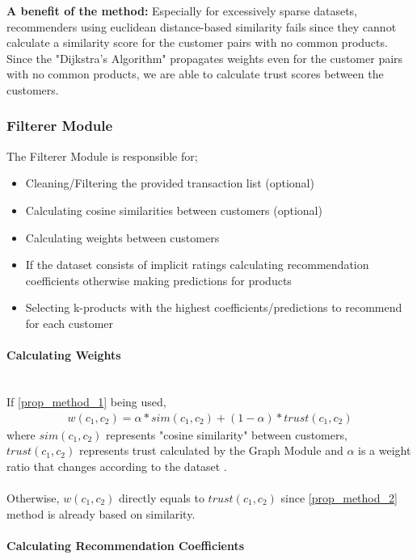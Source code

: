 	\textbf{A benefit of the method:} Especially for excessively sparse datasets, recommenders using euclidean distance-based similarity fails since they cannot calculate a similarity score for the customer pairs with no common products.	Since the  "Dijkstra's Algorithm" propagates weights even for the customer pairs with no common products, we are able to calculate trust scores between the customers.
	
	\subsubsection{Filterer Module} The Filterer Module is responsible for;
	\begin{itemize}
	\item Cleaning/Filtering the provided transaction list (optional)
	\item Calculating cosine similarities between customers (optional)
	\item Calculating weights between customers
	\item If the dataset consists of implicit ratings calculating recommendation coefficients otherwise making predictions for products
	\item Selecting k-products with the highest coefficients/predictions to recommend for each customer
	\end{itemize}

	\paragraph{Calculating Weights} \mbox{}\\
	If \ref{prop_method_1} being used,
	\begin{equation*} 
	\begin{split}
		w(c_{1}, c_{2}) = \alpha*sim(c_{1},c_{2})+(1-\alpha)*trust(c_{1},c_{2})
	\end{split}
	\end{equation*}
	where $sim(c_{1},c_{2})$ represents "cosine similarity" between customers, $trust(c_{1},c_{2})$ represents trust calculated by the Graph Module and $\alpha$ is a weight ratio that changes according to the dataset .\\ \\
	Otherwise, $w(c_{1}, c_{2})$ directly equals to $trust(c_{1},c_{2})$ since \ref{prop_method_2} method is already based on similarity.

	\paragraph{Calculating Recommendation Coefficients}

